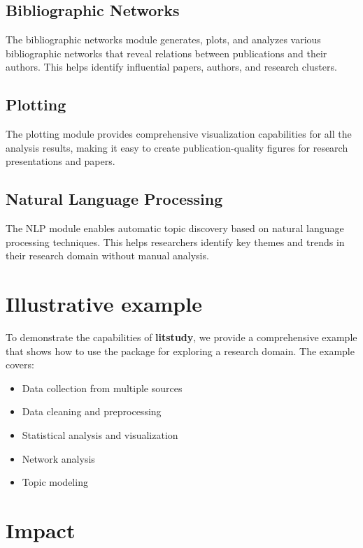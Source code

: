 \documentclass{article}
\begin{document}
\subsection{Bibliographic Networks}

The bibliographic networks module generates, plots, and analyzes various bibliographic networks that reveal relations between publications and their authors. This helps identify influential papers, authors, and research clusters.

\subsection{Plotting}

The plotting module provides comprehensive visualization capabilities for all the analysis results, making it easy to create publication-quality figures for research presentations and papers.

\subsection{Natural Language Processing}

The NLP module enables automatic topic discovery based on natural language processing techniques. This helps researchers identify key themes and trends in their research domain without manual analysis.

\section{Illustrative example}

To demonstrate the capabilities of \textbf{litstudy}, we provide a comprehensive example that shows how to use the package for exploring a research domain. The example covers:

\begin{itemize}
\item Data collection from multiple sources
\item Data cleaning and preprocessing
\item Statistical analysis and visualization
\item Network analysis
\item Topic modeling
\end{itemize}

\section{Impact}
\end{document}
